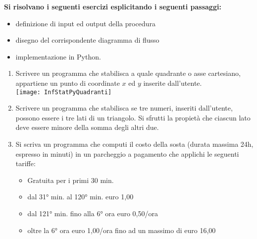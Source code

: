 \documentclass[a4]{article}
\begin{document}
{\noindent \Large{\bf Si risolvano i seguenti esercizi esplicitando i seguenti passaggi:}
\begin{itemize}
	\item definizione di input ed output della procedura
	\item disegno del corrispondente diagramma di flusso
	\item implementazione in Python.
\end{itemize}

\vspace{.5cm}
\begin{enumerate}
	\item Scrivere un programma che stabilisca a quale quadrante o asse cartesiano, appartiene un punto di coordinate $x$ ed $y$ inserite dall'utente.\\ \texttt{[image: InfStatPyQuadranti]}\\[.25cm]
	\item Scrivere un programma che stabilisca se tre numeri, inseriti dall'utente, possono essere i tre lati di un triangolo. Si sfrutti la propietà che ciascun lato deve essere minore della somma degli altri due.\\[.25cm]
	\item Si scriva un programma che computi il costo della sosta (durata massima 24h, espresso in minuti) in un parcheggio a pagamento che applichi le seguenti tariffe:
	\begin{itemize}
		\item Gratuita per i primi  30 min.
		\item dal 31° min. al 120° min.    euro 1,00
		\item dal 121° min. fino alla 6° ora  euro 0,50/ora
		\item oltre la 6° ora  euro 1,00/ora fino ad un massimo di euro 16,00
	\end{itemize}
\end{enumerate}
}
\end{document}
